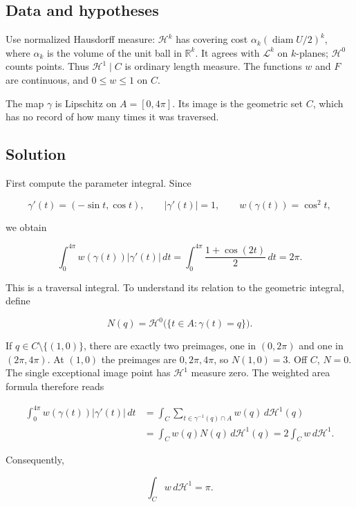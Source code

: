 \documentclass[
  11pt,
]{article}
\begin{document}
\subsection{Data and hypotheses}\label{data-and-hypotheses-7}

Use normalized Hausdorff measure: \(\mathcal H^k\) has covering cost
\(\alpha_k(\operatorname{diam}U/2)^k\), where \(\alpha_k\) is the volume
of the unit ball in \(\mathbb R^k\). It agrees with \(\mathcal L^k\) on
\(k\)-planes; \(\mathcal H^0\) counts points. Thus
\(\mathcal H^1\mathbin{\vert}C\) is ordinary length measure. The
functions \(w\) and \(F\) are continuous, and \(0\leq w\leq1\) on \(C\).

The map \(\gamma\) is Lipschitz on \(A=[0,4\pi]\). Its image is the
geometric set \(C\), which has no record of how many times it was
traversed.

\subsection{Solution}\label{solution-7}

First compute the parameter integral. Since

\[
\gamma'(t)=(-\sin t,\cos t),\qquad |\gamma'(t)|=1,
\qquad w(\gamma(t))=\cos^2t,
\]

we obtain

\[
\int_0^{4\pi}w(\gamma(t))|\gamma'(t)|\,dt
=\int_0^{4\pi}\frac{1+\cos(2t)}2\,dt
=\boxed{2\pi}.
\]

This is a traversal integral. To understand its relation to the
geometric integral, define

\[
N(q)=\mathcal H^0\bigl(\{t\in A:\gamma(t)=q\}\bigr).
\]

If \(q\in C\setminus\{(1,0)\}\), there are exactly two preimages, one in
\((0,2\pi)\) and one in \((2\pi,4\pi)\). At \((1,0)\) the preimages are
\(0,2\pi,4\pi\), so \(N(1,0)=3\). Off \(C\), \(N=0\). The single
exceptional image point has \(\mathcal H^1\) measure zero. The weighted
area formula therefore reads

\[
\begin{aligned}
\int_0^{4\pi}w(\gamma(t))|\gamma'(t)|\,dt
&=\int_C\sum_{t\in\gamma^{-1}(q)\cap A}w(q)\,d\mathcal H^1(q)\\
&=\int_C w(q)N(q)\,d\mathcal H^1(q)
=2\int_C w\,d\mathcal H^1.
\end{aligned}
\]

Consequently,

\[
\boxed{\int_C w\,d\mathcal H^1=\pi}.
\]
\end{document}
